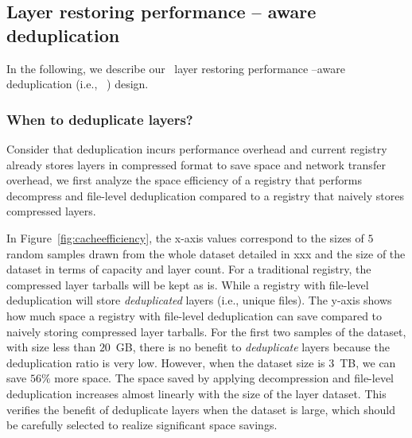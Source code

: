 \subsection{Layer restoring performance -- aware deduplication}
\label{sec:design_operations}

%
In the following, we describe our \sysname~layer restoring performance --aware deduplication
 (i.e., \sysname~\dedupname) design. 


\subsubsection{When to deduplicate layers?}



Consider that deduplication incurs performance overhead and current registry already stores layers in compressed format to save space and network transfer overhead, 
 we first analyze the space efficiency of a registry that performs decompress and file-level deduplication compared to 
 a registry that naively stores compressed layers.

In Figure~\ref{fig:cacheefficiency}, the x-axis values correspond to the sizes of $5$ random samples drawn from the whole dataset detailed in xxx and the size of the dataset in terms of capacity and layer count.
For a traditional registry, the compressed layer tarballs will be kept as is.
While a registry with file-level deduplication will store \emph{deduplicated} layers (i.e., unique files). 
The y-axis shows how much space a registry with file-level deduplication can save compared to naively storing compressed layer tarballs.
For the first two samples of the dataset, with size less than $20$~GB, 
there is no benefit to \emph{deduplicate} layers 
because the deduplication ratio is very low.
However, when the dataset size is $3$~TB, we can save $56\%$ more space.
The space saved by applying decompression and file-level deduplication increases almost linearly with the size of the layer dataset.
This verifies the benefit of deduplicate layers when the dataset is large, which should be carefully selected to realize significant space savings.

